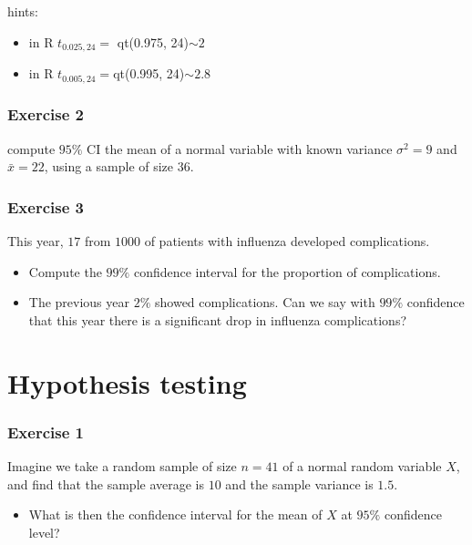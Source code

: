\documentclass[
]{book}
\providecommand{\tightlist}{%
  \setlength{\itemsep}{0pt}\setlength{\parskip}{0pt}}
\begin{document}
hints:

\begin{itemize}
\item
  in R \(t_{0.025, 24}=\) qt(0.975, 24)\(\sim 2\)
\item
  in R \(t_{0.005, 24}=\)qt(0.995, 24)\(\sim 2.8\)
\end{itemize}

\hypertarget{exercise-2-9}{%
\subsubsection{Exercise 2}\label{exercise-2-9}}

compute \(95\%\) CI the mean of a normal variable with known variance \(\sigma^2=9\) and \(\bar{x}=22\), using a sample of size \(36\).

\hypertarget{exercise-3-6}{%
\subsubsection{Exercise 3}\label{exercise-3-6}}

This year, \(17\) from \(1000\) of patients with influenza developed complications.

\begin{itemize}
\item
  Compute the \(99\%\) confidence interval for the proportion of complications.
\item
  The previous year \(2\%\) showed complications. Can we say with \(99\%\) confidence that this year there is a significant drop in influenza complications?
\end{itemize}

\hypertarget{hypothesis-testing-7}{%
\section{Hypothesis testing}\label{hypothesis-testing-7}}

\hypertarget{exercise-1-10}{%
\subsubsection{Exercise 1}\label{exercise-1-10}}

Imagine we take a random sample of size \(n = 41\) of a normal random variable \(X\), and find that the sample average is \(10\) and the sample variance is \(1.5\).

\begin{itemize}
\tightlist
\item
  What is then the confidence interval for the mean of \(X\) at \(95\%\) confidence level?
\end{itemize}
\end{document}
